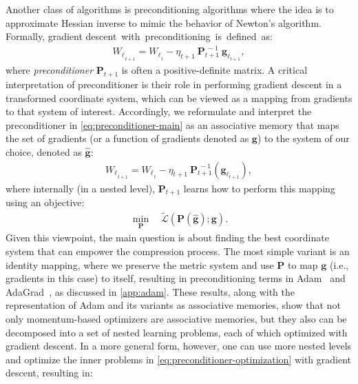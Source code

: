 Another class of algorithms is preconditioning algorithms where the idea is to approximate Hessian inverse to mimic the behavior of Newton's algorithm. 
Formally, gradient descent~with~preconditioning~is~defined~as:
\begin{align}\label{eq:preconditioner-main}
    {W_{\ell}}_{_{t+1}} = {W_{\ell}}_{_{t}} - \eta_{t+1} \: \boldsymbol{P}^{\:-1}_{t+1} \:{\boldsymbol{g}_{\ell_{t+1}}},
\end{align}
where \emph{preconditioner} $\boldsymbol{P}_{t+1}$ is often a positive-definite matrix. A critical interpretation of preconditioner is their role in performing gradient descent in a  transformed coordinate system, which can be viewed as a mapping from gradients to that system of interest. Accordingly, we reformulate and interpret the preconditioner in \autoref{eq:preconditioner-main} as an associative memory that maps the set of gradients (or a function of gradients denoted as $\boldsymbol{g}$) to the system of our choice, denoted as $\hat{\boldsymbol{g}}$:
\begin{align}\label{eq:preconditioner-memory}
    {W_{\ell}}_{_{t+1}} = {W_{\ell}}_{_{t}} - \eta_{t+1} \: \boldsymbol{P}_{t+1}^{\:-1} \!\left({\boldsymbol{g}_{\ell_{t+1}}}\right),
\end{align}
where internally (in a nested level), $\boldsymbol{P}_{t+1}$ learns how to perform this mapping using an objective:
\begin{align}\label{eq:preconditioner-optimization}
\min_{\boldsymbol{P}} \quad   \tilde{\mathcal{L}} \left( \boldsymbol{P}\left( \hat{\boldsymbol{g}} \right); \boldsymbol{g} \right).
\end{align}
Given this viewpoint, the main question is about finding the best coordinate system that can empower the compression process. The most simple variant is an identity mapping, where we preserve the metric system and use $\boldsymbol{P}$ to map $\boldsymbol{g}$ (i.e., gradients in this case) to itself, resulting in preconditioning terms in Adam~\citep{kingma2014adam} and AdaGrad~\citep{duchi2011adaptive}, as discussed in \autoref{app:adam}. These results, along with the representation of Adam and its variants as associative memories, show that not only momentum-based optimizers are associative memories, but they also can be decomposed into a set of nested learning problems, each of which optimized with gradient descent. In a more general form, however, one can use more nested levels and optimize the inner problems in \autoref{eq:preconditioner-optimization} with gradient descent, resulting in:
